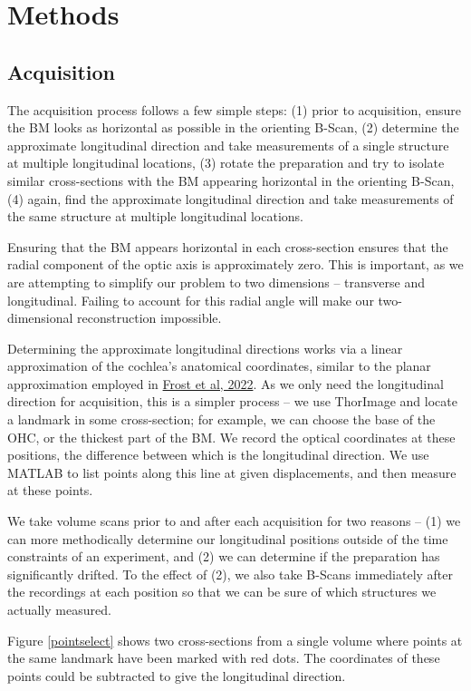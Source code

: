 \documentclass{article}
\begin{document}
\section{Methods}
\subsection{Acquisition}
\par{The acquisition process follows a few simple steps: (1) prior to acquisition, ensure the BM looks as horizontal as possible in the orienting B-Scan, (2) determine the approximate longitudinal direction and take measurements of a single structure at multiple longitudinal locations, (3) rotate the preparation and try to isolate similar cross-sections with the BM appearing horizontal in the orienting B-Scan, (4) again, find the approximate longitudinal direction and take measurements of the same structure at multiple longitudinal locations.}
\par{Ensuring that the BM appears horizontal in each cross-section ensures that the radial component of the optic axis is approximately zero. This is important, as we are attempting to simplify our problem to two dimensions -- transverse and longitudinal. Failing to account for this radial angle will make our two-dimensional reconstruction impossible.}
\par{Determining the approximate longitudinal directions works via a linear approximation of the cochlea's anatomical coordinates, similar to the planar approximation employed in \href{https://asa.scitation.org/doi/full/10.1121/10.0009576}{Frost et al, 2022}. As we only need the longitudinal direction for acquisition, this is a simpler process -- we use ThorImage and locate a landmark in some cross-section; for example, we can choose the base of the OHC, or the thickest part of the BM. We record the optical coordinates at these positions, the difference between which is the longitudinal direction. We use MATLAB to list points along this line at given displacements, and then measure at these points.}
\par{We take volume scans prior to and after each acquisition for two reasons -- (1) we can more methodically determine our longitudinal positions outside of the time constraints of an experiment, and (2) we can determine if the preparation has significantly drifted. To the effect of (2), we also take B-Scans immediately after the recordings at each position so that we can be sure of which structures we actually measured.}
\par{Figure \ref{pointselect} shows two cross-sections from a single volume where points at the same landmark have been marked with red dots. The coordinates of these points could be subtracted to give the longitudinal direction.}
\end{document}
